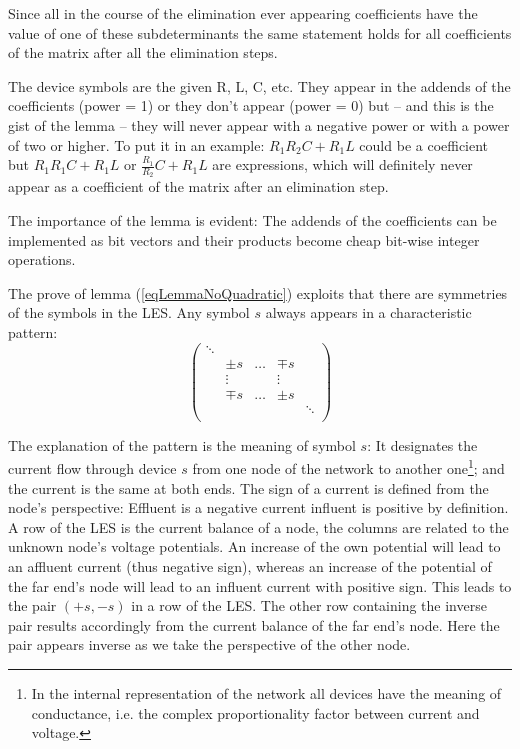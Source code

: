 \noindent
Since all in the course of the elimination ever appearing coefficients
have the value of one of these subdeterminants the same statement holds
for all coefficients of the matrix after all the elimination steps.

The device symbols are the given R, L, C, etc. They appear in the addends
of the coefficients (power = 1) or they don't appear (power = 0) but --
and this is the gist of the lemma -- they will never appear with a
negative power or with a power of two or higher. To put it in an example:
$R_1 R_2 C + R_1 L$ could be a coefficient but $R_1 R_1 C + R_1 L$ or
$\frac{R_1}{R_2} C + R_1 L$ are expressions, which will definitely never
appear as a coefficient of the matrix after an elimination step.

The importance of the lemma is evident: The addends of the coefficients
can be implemented as bit vectors and their products become cheap bit-wise
integer operations.

The prove of lemma (\ref{eqLemmaNoQuadratic}) exploits that there are
symmetries of the symbols in the LES. Any symbol $s$ always appears in a
characteristic pattern:
\begin{equation}
\label{eqMatrixPatternInS}
\left(
\begin{array}{ccccc}
\ddots & & & & \\
 & \pm s & \ldots & \mp s & \\
 & \vdots & & \vdots & \\
 & \mp s & \ldots & \pm s & \\
 & & & & \ddots \\
\end{array}
\right)
\end{equation}

The explanation of the pattern is the meaning of symbol $s$: It designates
the current flow through device $s$ from one node of the network to
another one\footnote{In the internal representation of the network all
devices have the meaning of conductance, i.e. the complex proportionality
factor between current and voltage.}; and the current is the same at both
ends. The sign of a current is defined from the node's perspective:
Effluent is a negative current influent is positive by definition. A row
of the LES is the current balance of a node, the columns are related to
the unknown node's voltage potentials. An increase of the own potential
will lead to an affluent current (thus negative sign), whereas an increase
of the potential of the far end's node will lead to an influent current
with positive sign. This leads to the pair $(+s, -s)$ in a row of the
LES. The other row containing the inverse pair results accordingly from
the current balance of the far end's node. Here the pair appears inverse
as we take the perspective of the other node.


